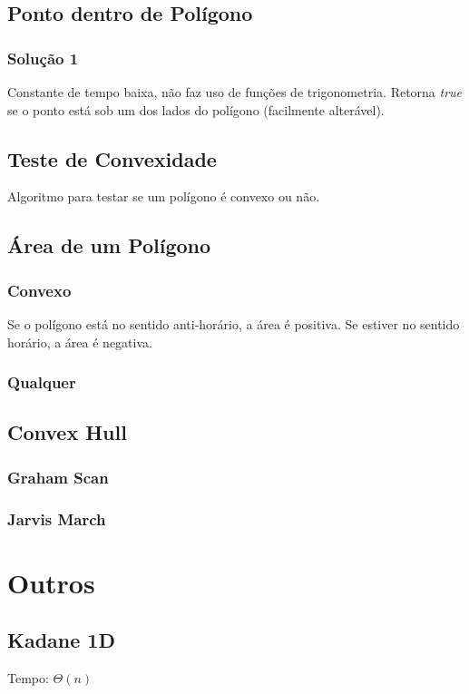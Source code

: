 \documentclass[12pt,a4paper]{article}
\begin{document}
		\subsection{Ponto dentro de Polígono}
			\subsubsection{Solução 1}
				Constante de tempo baixa, não faz uso de funções de trigonometria. Retorna \emph{true} se o ponto está sob um dos lados do polígono (facilmente alterável).
				
		\subsection{Teste de Convexidade}
			Algoritmo para testar se um polígono é convexo ou não.
		\subsection{Área de um Polígono}
			\subsubsection{Convexo}
				Se o polígono está no sentido anti-horário, a área é positiva. Se estiver no sentido horário, a área é negativa.
				
			\subsubsection{Qualquer}
				
		\subsection{Convex Hull}
			\subsubsection{Graham Scan}
				
			\subsubsection{Jarvis March}
				

	\section{Outros}
		\subsection{Kadane 1D}
			Tempo: \(\Theta(n)\)
			
\end{document}
